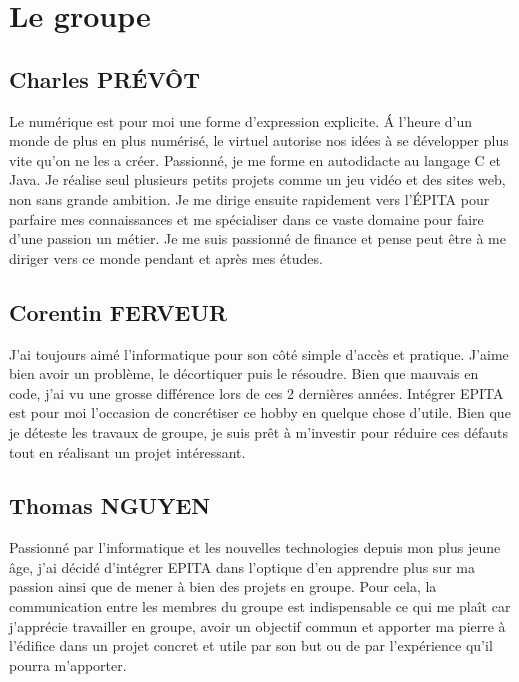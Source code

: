 \documentclass[a4paper,12pt]{article}
\begin{document}
\newpage

\section {Le groupe}

\subsection{Charles PRÉVÔT}

Le numérique est pour moi une forme d'expression explicite. Á l'heure d'un monde de plus en plus numérisé, le virtuel autorise nos idées à se développer plus vite qu'on ne les a créer. Passionné, je me forme en autodidacte au langage C et Java. Je réalise seul plusieurs petits projets comme un jeu vidéo et des sites web, non sans grande ambition. Je me dirige ensuite rapidement vers l'ÉPITA pour parfaire mes connaissances et me spécialiser dans ce vaste domaine pour faire d'une passion un métier. Je me suis passionné de finance et pense peut être à me diriger vers ce monde pendant et après mes études.


\subsection{Corentin FERVEUR}

J'ai toujours aimé l'informatique pour son côté simple d'accès et pratique. J'aime bien avoir un problème, le décortiquer puis le résoudre. Bien que mauvais en code, j'ai vu une grosse différence lors de ces 2 dernières années. 
Intégrer EPITA est pour moi l'occasion de concrétiser ce hobby en quelque chose d'utile. Bien que je déteste les travaux de groupe, je suis prêt à m'investir pour réduire ces défauts tout en réalisant un projet intéressant.

\newpage

\subsection{Thomas NGUYEN}

Passionné par l'informatique et les nouvelles technologies depuis mon plus jeune âge, j'ai décidé d'intégrer EPITA dans l'optique d'en apprendre plus sur ma passion ainsi que de mener à bien des projets en groupe. Pour cela, la communication entre les membres du groupe est indispensable ce qui me plaît car j'apprécie travailler en groupe, avoir un objectif commun et apporter ma pierre à l'édifice dans un projet concret et utile par son but ou de par l'expérience qu'il pourra m'apporter.
\end{document}

